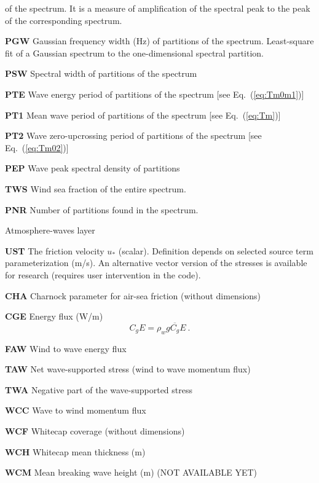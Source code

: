 \begin{list}{)\hfill}
\begin{list}{)\hfill}
      of the spectrum. It is a measure of amplification
      of the spectral peak to the peak of the corresponding
      \citeauthor{art:PM64} spectrum.
\item \textbf{PGW} Gaussian frequency width (Hz) of partitions of the spectrum.
      Least-square fit of a Gaussian spectrum to the one-dimensional spectral partition.
\item \textbf{PSW} Spectral width of partitions of the spectrum \citep{art:LH84}
\item \textbf{PTE} Wave energy period of partitions of the spectrum [see Eq.~(\ref{eq:Tm0m1})] 
\item \textbf{PT1} Mean wave period of partitions of the spectrum [see Eq.~(\ref{eq:Tm})] 
\item \textbf{PT2} Wave zero-upcrossing period of partitions of the spectrum [see Eq.~(\ref{eq:Tm02})]
\item \textbf{PEP} Wave peak spectral density of partitions
\item \textbf{TWS} Wind sea fraction of the entire spectrum.
\item \textbf{PNR} Number of partitions found in the spectrum.
\end{list}


\item{Atmosphere-waves layer}
\begin{list}{)\hfill}
            { \leftmargin 8mm 
             \rightmargin 0mm \itemsep 0mm \parsep 0mm}
\item \textbf{UST}  The friction velocity $u_\ast$ (scalar). Definition depends on
      selected source term parameterization (m/s). An alternative vector version
      of the stresses is available for research (requires user intervention in
      the code).
\item \textbf{CHA}  Charnock parameter for air-sea friction (without dimensions)
\item \textbf{CGE} Energy flux (W/m)
      \begin{equation} C_g E =  \rho_w g \overline{C_g} E
      \: . \label{eq:CgE} \end{equation}
\item \textbf{FAW} Wind to wave energy flux
\item \textbf{TAW} Net wave-supported stress (wind to wave momentum flux) 
\item \textbf{TWA} Negative part of the wave-supported stress
\item \textbf{WCC} Wave to wind momentum flux
\item \textbf{WCF} Whitecap coverage (without dimensions) 
\item \textbf{WCH} Whitecap mean thickness (m) 
\item \textbf{WCM} Mean breaking wave height (m) (NOT AVAILABLE YET)
\end{list}


\end{list}
